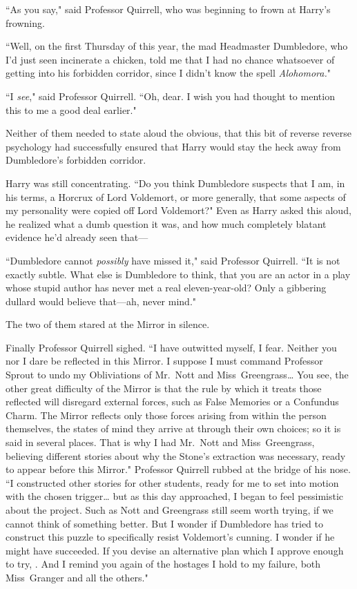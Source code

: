 ``As you say," said Professor Quirrell, who was beginning to frown at Harry's frowning.

``Well, on the first Thursday of this year, the mad Headmaster Dumbledore, who I'd just seen incinerate a chicken, told me that I had no chance whatsoever of getting into his forbidden corridor, since I didn't know the spell \emph{Alohomora.}"

``I \emph{see}," said Professor Quirrell. ``Oh, dear. I wish you had thought to mention this to me a good deal earlier."

Neither of them needed to state aloud the obvious, that this bit of reverse reverse psychology had successfully ensured that Harry would stay the heck away from Dumbledore's forbidden corridor.

Harry was still concentrating. ``Do you think Dumbledore suspects that I am, in his terms, a Horcrux of Lord Voldemort, or more generally, that some aspects of my personality were copied off Lord Voldemort?" Even as Harry asked this aloud, he realized what a dumb question it was, and how much completely blatant evidence he'd already seen that---

``Dumbledore cannot \emph{possibly} have missed it," said Professor Quirrell. ``It is not exactly subtle. What else is Dumbledore to think, that you are an actor in a play whose stupid author has never met a real eleven-year-old? Only a gibbering dullard would believe that---ah, never mind."

The two of them stared at the Mirror in silence.

Finally Professor Quirrell sighed. ``I have outwitted myself, I fear. Neither you nor I dare be reflected in this Mirror. I suppose I must command Professor Sprout to undo my Obliviations of Mr.~Nott and Miss~Greengrass{\ldots} You see, the other great difficulty of the Mirror is that the rule by which it treats those reflected will disregard external forces, such as False Memories or a Confundus Charm. The Mirror reflects only those forces arising from within the person themselves, the states of mind they arrive at through their own choices; so it is said in several places. That is why I had Mr.~Nott and Miss~Greengrass, believing different stories about why the Stone's extraction was necessary, ready to appear before this Mirror." Professor Quirrell rubbed at the bridge of his nose. ``I constructed other stories for other students, ready for me to set into motion with the chosen trigger{\ldots} but as this day approached, I began to feel pessimistic about the project. Such as Nott and Greengrass still seem worth trying, if we cannot think of something better. But I wonder if Dumbledore has tried to construct this puzzle to specifically resist Voldemort's cunning. I wonder if he might have succeeded. If you devise an alternative plan which I approve enough to try, . And I remind you again of the hostages I hold to my failure, both Miss~Granger and all the others."

